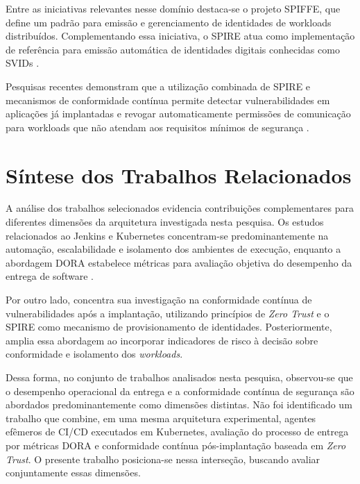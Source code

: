Entre as iniciativas relevantes nesse domínio destaca-se o projeto SPIFFE, que define um padrão para emissão e gerenciamento de identidades de workloads distribuídos. Complementando essa iniciativa, o SPIRE atua como implementação de referência para emissão automática de identidades digitais conhecidas como SVIDs \cite{gama2024}.

Pesquisas recentes demonstram que a utilização combinada de SPIRE e mecanismos de conformidade contínua permite detectar vulnerabilidades em aplicações já implantadas e revogar automaticamente permissões de comunicação para workloads que não atendam aos requisitos mínimos de segurança \cite{gama2024}.

\section{Síntese dos Trabalhos Relacionados}
\label{sec:sintese-trabalhos-relacionados}

A análise dos trabalhos selecionados evidencia contribuições complementares para
diferentes dimensões da arquitetura investigada nesta pesquisa. Os estudos relacionados
ao Jenkins e Kubernetes concentram-se predominantemente na automação, escalabilidade e
isolamento dos ambientes de execução, enquanto a abordagem DORA estabelece métricas para
avaliação objetiva do desempenho da entrega de software \cite{dora2024}.

Por outro lado,  concentra sua investigação na conformidade
contínua de vulnerabilidades após a implantação, utilizando princípios de \textit{Zero Trust}
e o SPIRE como mecanismo de provisionamento de identidades. Posteriormente,
 amplia essa abordagem ao incorporar indicadores de risco à decisão
sobre conformidade e isolamento dos \textit{workloads}.

Dessa forma, no conjunto de trabalhos analisados nesta pesquisa, observou-se que o
desempenho operacional da entrega e a conformidade contínua de segurança são abordados
predominantemente como dimensões distintas. Não foi identificado um trabalho que combine,
em uma mesma arquitetura experimental, agentes efêmeros de CI/CD executados em Kubernetes,
avaliação do processo de entrega por métricas DORA e conformidade contínua pós-implantação
baseada em \textit{Zero Trust}. O presente trabalho posiciona-se nessa interseção, buscando
avaliar conjuntamente essas dimensões.
